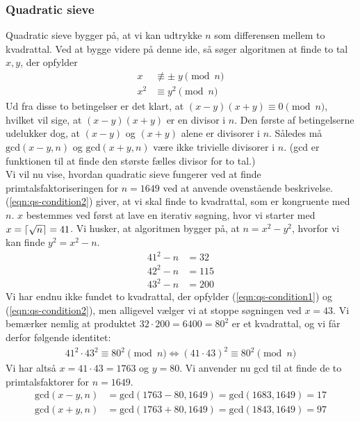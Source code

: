 \subsubsection{Quadratic sieve}
Quadratic sieve bygger på, at vi kan udtrykke $n$ som differensen mellem to kvadrattal. Ved
at bygge videre på denne ide, så søger algoritmen at finde to tal $x, y$, der opfylder
\begin{align}
  x & \not \equiv \pm \; y \pmod{n} \label{eqn:qs-condition1} \\
  x^2 & \equiv y^2 \pmod{n} \label{eqn:qs-condition2}
\end{align}
Ud fra disse to betingelser er det klart, at $(x - y)(x + y) \equiv 0 \pmod{n}$, hvilket vil
sige, at $(x - y)(x + y)$ er en divisor i $n$. Den første af betingelserne udelukker dog, at
$(x - y)$ og $(x + y)$ alene er divisorer i $n$. Således må $\text{gcd}(x - y, n)$ og
$\text{gcd}(x + y, n)$ være ikke trivielle divisorer i $n$. (gcd er funktionen til at finde
den største fælles divisor for to tal.)\\
Vi vil nu vise, hvordan quadratic sieve fungerer ved at finde primtalsfaktoriseringen for
$n = 1649$ ved at anvende ovenstående beskrivelse. (\ref{eqn:qs-condition2}) giver, at vi skal finde
to kvadrattal, som er kongruente med $n$. $x$ bestemmes ved først at lave en iterativ søgning,
hvor vi starter med $x = \lceil\sqrt{n}\rceil = 41$. Vi husker, at algoritmen bygger på, at
$n = x^2 - y^2$, hvorfor vi kan finde $y^2 = x^2 - n$.
\begin{align*}
  41^2 - n &= 32 \\
  42^2 - n &= 115 \\
  43^2 - n &= 200
\end{align*}
Vi har endnu ikke fundet to kvadrattal, der opfylder (\ref{eqn:qs-condition1}) og (\ref{eqn:qs-condition2}),
men alligevel vælger vi at stoppe søgningen ved $x = 43$. Vi bemærker nemlig at produktet
$32 \cdot 200 = 6400 = 80^2$ er et kvadrattal, og vi får derfor følgende identitet:
\begin{align*}
  41^2 \cdot 43^2 \equiv 80^2 \pmod{n} \iff (41 \cdot 43)^2 \equiv 80^2 \pmod{n}
\end{align*}
Vi har altså $x = 41 \cdot 43 = 1763$ og $y = 80$. Vi anvender nu gcd til at finde de
to primtalsfaktorer for $n = 1649$.\\
\begin{align*}
  \text{gcd}(x - y, n) &= \text{gcd}(1763 - 80, 1649) = \text{gcd}(1683, 1649) = 17 \\
  \text{gcd}(x + y, n) &= \text{gcd}(1763 + 80, 1649) = \text{gcd}(1843, 1649) = 97
\end{align*}
